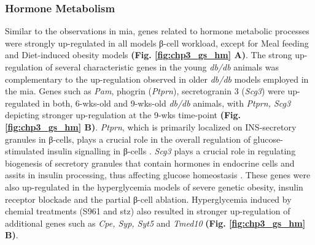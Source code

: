 
\subsubsection{Hormone Metabolism}
\label{subsec:hormone}
Similar to the observations in \gls{mia}, genes related to hormone metabolic processes were strongly up-regulated in all models β-cell workload, except for Meal feeding and Diet-induced obesity models \textbf{(Fig. \ref{fig:chp3_gs_hm} A)}. The strong up-regulation of several characteristic genes in the young \textit{db/db} animals was complementary to the up-regulation observed in older \textit{db/db} models employed in the \gls{mia}. Genes such as \textit{Pam}, phogrin (\textit{Ptprn}), secretogranin 3 (\textit{Scg3}) were up-regulated in both, 6-wks-old and 9-wks-old \textit{db/db} animals, with \textit{Ptprn, Scg3} depicting stronger up-regulation at the 9-wks time-point \textbf{(Fig. \ref{fig:chp3_gs_hm} B)}. \textit{Ptprn}, which is primarily localized on INS-secretory granules in β-cells, plays a crucial role in the overall regulation of glucose-stimulated insulin signalling in β-cells \textbf{\cite{torii_pseudophosphatase_2018}}. \textit{Scg3} plays a crucial role in regulating biogenesis of secretory granules that contain hormones in endocrine cells and assits in insulin processing, thus affecting glucose homeostasis \textbf{\cite{lin_serum_2019}}. These genes were also up-regulated in the hyperglycemia models of severe genetic obesity, insulin receptor blockade and the partial β-cell ablation. Hyperglycemia induced by chemial treatments (S961 and \gls{stz}) also resulted in stronger up-regulation of additional genes such as \textit{Cpe, Syp, Syt5} and \textit{Tmed10} \textbf{(Fig. \ref{fig:chp3_gs_hm} B)}.


